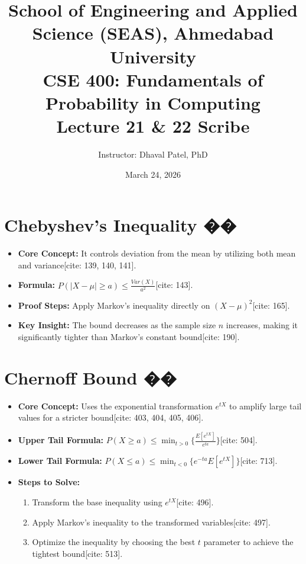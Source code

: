\documentclass{article}
\title{\textbf{School of Engineering and Applied Science (SEAS), Ahmedabad University} \\
\vspace{0.3cm}
\large CSE 400: Fundamentals of Probability in Computing \\
Lecture 21 \& 22 Scribe}
\author{Instructor: Dhaval Patel, PhD}
\date{March 24, 2026}
\begin{document}
\maketitle

\section{Chebyshev's Inequality ��}
\begin{itemize}
    \item \textbf{Core Concept:} It controls deviation from the mean by utilizing both mean and variance[cite: 139, 140, 141].
    \item \textbf{Formula:} $P(|X-\mu|\ge a)\le\frac{Var(X)}{a^{2}}$[cite: 143].
    \item \textbf{Proof Steps:} Apply Markov's inequality directly on $(X-\mu)^{2}$[cite: 165].
    \item \textbf{Key Insight:} The bound decreases as the sample size $n$ increases, making it significantly tighter than Markov's constant bound[cite: 190].
\end{itemize}

\section{Chernoff Bound ��}
\begin{itemize}
    \item \textbf{Core Concept:} Uses the exponential transformation $e^{tX}$ to amplify large tail values for a stricter bound[cite: 403, 404, 405, 406].
    \item \textbf{Upper Tail Formula:} $P(X\ge a)\le \min_{t>0}\{\frac{E[e^{tX}]}{e^{ta}}\}$[cite: 504].
    \item \textbf{Lower Tail Formula:} $P(X\le a)\le \min_{t<0}\{e^{-ta}E[e^{tX}]\}$[cite: 713].
    \item \textbf{Steps to Solve:}
    \begin{enumerate}
        \item Transform the base inequality using $e^{tX}$[cite: 496].
        \item Apply Markov's inequality to the transformed variables[cite: 497].
        \item Optimize the inequality by choosing the best $t$ parameter to achieve the tightest bound[cite: 513].
    \end{enumerate}
\end{itemize}
\end{document}
